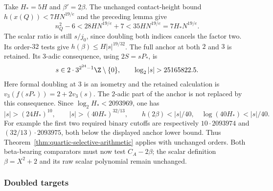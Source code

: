 Take $H_*=5H$ and $\beta'=2\beta$. The unchanged contact-height bound
$h(x(Q))<7HN^{19/e}$ and the preceding lemma give
\[
 n_Q^2-6<28HN^{19/e}+7<35HN^{19/e}=7H_*N^{19/e}.
\]
The scalar ratio is still $s/j_0$, since doubling both indices cancels
the factor two. Its order-$32$ tests give
$h(\beta)\le H|s|^{19/32}$. The full anchor at both $2$ and $3$ is
retained. Its $3$-adic consequence, using $2S=sP_*$, is
\[
 s\in2\cdot3^{2^{24}-1}\Z\setminus\{0\},\qquad
 \log_2|s|>25165822.5.
\]
Here formal doubling at $3$ is an isometry and the retained calculation
is $v_3(f(sP_*))=2+2v_3(s)$. The $2$-adic part of the anchor is not
replaced by this consequence. Since $\log_2H_*<2093969$, one has
\[
 |s|>(24H_*)^{10},\qquad |s|>(40H_*)^{32/13},\qquad
 h(2\beta)<|s|/40,\quad\log(40H_*)<|s|/40.
\]
For example the first two required binary cutoffs are respectively
$10\cdot2093974$ and $(32/13)\cdot2093975$, both below the displayed
anchor lower bound. Thus Theorem~\ref{thm:quartic-selective-arithmetic}
applies with unchanged orders. Both beta-bearing comparators must now
test $C_A-2\beta$; the scalar definition $\beta=X^2+2$ and its raw scalar
polynomial remain unchanged.


\subsubsection{Doubled targets}
\label{sec:quartic-target-two-variant}

